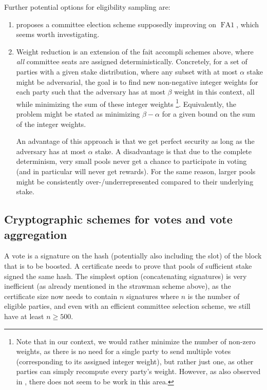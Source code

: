 Further potential options for eligibility sampling are:
\begin{enumerate}
\item
  \cite{alpenglow} proposes a committee election scheme supposedly improving on $\operatorname{FA1}$, which seems worth investigating.
\item
  Weight reduction \parencite{tonkikh2024swiper,cryptoeprint:2025/1076} is an extension of the fait accompli schemes above, where \emph{all} committee seats are assigned deterministically.
  Concretely, for a set of parties with a given stake distribution, where any subset with at most $\alpha$ stake might be adversarial, the goal is to find new non-negative integer weights for each party such that the adversary has at most $\beta$ weight in this context, all while minimizing the sum of these integer weights%
  \footnote{Note that in our context, we would rather minimize the number of non-zero weights, as there is no need for a single party to send multiple votes (corresponding to its assigned integer weight), but rather just one, as other parties can simply recompute every party's weight. However, as also observed in \cite{cryptoeprint:2025/1076}, there does not seem to be work in this area.}.
  Equivalently, the problem might be stated as minimizing $\beta-\alpha$ for a given bound on the sum of the integer weights.

  An advantage of this approach is that we get perfect security as long as the adversary has at most $\alpha$ stake.
  A disadvantage is that due to the complete determinism, very small pools never get a chance to participate in voting (and in particular will never get rewards).
  For the same reason, larger pools might be consistently over-/underrepresented compared to their underlying stake.
\end{enumerate}

\subsection{Cryptographic schemes for votes and vote aggregation}\label{sec:crypto votes agg}

A vote is a signature on the hash (potentially also including the slot) of the block that is to be boosted.
A certificate needs to prove that pools of sufficient stake signed the same hash.
The simplest option (concatenating signatures) is very inefficient (as already mentioned in the strawman scheme above), as the certificate size now needs to contain $n$ signatures where $n$ is the number of eligible parties, and even with an efficient committee selection scheme, we still have at least $n\ge 500$.


